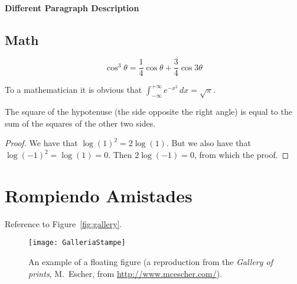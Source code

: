 \documentclass[
10pt, %
a4paper, %
oneside, %
headinclude,footinclude, %
BCOR5mm, %
]{scrartcl}
\begin{document}
\paragraph{Different Paragraph Description} \lipsum[8] %


\subsection{Math}

\lipsum[4] %

\begin{equation}
\cos^3 \theta =\frac{1}{4}\cos\theta+\frac{3}{4}\cos 3\theta
\label{eq:refname2}
\end{equation}

\lipsum[5] %

\begin{definition}[Gauss] 
To a mathematician it is obvious that
$\int_{-\infty}^{+\infty}
e^{-x^2}\,dx=\sqrt{\pi}$. 
\end{definition} 

\begin{theorem}[Pythagoras]
The square of the hypotenuse (the side opposite the right angle) is equal to the sum of the squares of the other two sides.
\end{theorem}

\begin{proof} 
We have that $\log(1)^2 = 2\log(1)$.
But we also have that $\log(-1)^2=\log(1)=0$.
Then $2\log(-1)=0$, from which the proof.
\end{proof}


\section{Rompiendo Amistades}

Reference to Figure~\vref{fig:gallery}. %

\begin{figure}[tb]
\centering 
\texttt{[image: GalleriaStampe]} 
\caption[An example of a floating figure]{An example of a floating figure (a reproduction from the \emph{Gallery of prints}, M.~Escher, from \url{http://www.mcescher.com/}).} %
\label{fig:gallery} 
\end{figure}
\end{document}
